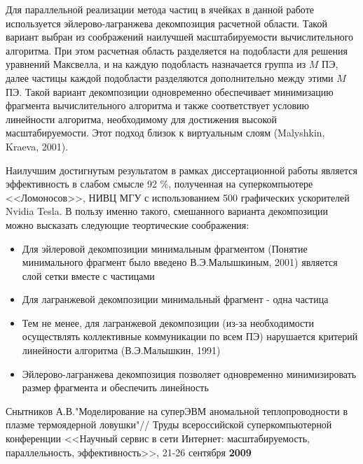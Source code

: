 Для параллельной реализации метода частиц в ячейках в данной работе используется эйлерово-лагранжева декомпозиция расчетной области. Такой вариант выбран из соображений наилучшей масштабируемости вычислительного алгоритма.
При этом расчетная область разделяется на подобласти для решения уравнений Максвелла, и на каждую подобласть назначается группа из $M$ ПЭ, далее частицы каждой подобласти разделяются дополнительно между этими $M$ ПЭ. Такой вариант декомпозиции одновременно обеспечивает минимизацию фрагмента вычислительного алгоритма и также соответствует условию линейности алгоритма, необходимому для достижения высокой масштабируемости. Этот подход близок к виртуальным слоям (Malyshkin, Kraeva, 2001).



Наилучшим достигнутым результатом в рамках диссертационной работы является эффективность в слабом смысле 92 \%, полученная на суперкомпьютере <<Ломоносов>>, НИВЦ МГУ с использованием 500 графических ускорителей Nvidia Tesla. 
В пользу именно такого, смешанного варианта декомпозиции можно высказать следующие теортические соображения:
\begin{itemize}
	\item Для эйлеровой декомпозиции минимальным фрагментом (Понятие минимального фрагмент было введено В.Э.Малышкиным, 2001) является слой сетки вместе с частицами
	\item Для лагранжевой декомпозиции минимальный фрагмент - одна частица
	\item Тем не менее, для лагранжевой декомпозиции (из-за необходимости осуществлять коллективные коммуникации по всем ПЭ) нарушается критерий линейности алгоритма (В.Э.Малышкин, 1991)
	\item Эйлерово-лагранжева декомпозиция позволяет одновременно минимизировать размер фрагмента и обеспечить линейность
	
\end{itemize}

{\small Снытников А.В."Моделирование на суперЭВМ аномальной  теплопроводности в плазме термоядерной ловушки"// Труды всероссийской суперкомпьютерной конференции <<Научный сервис в сети Интернет: масштабируемость, параллельность, эффективность>>, 21-26 сентября \textbf{2009}}


